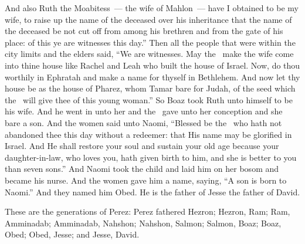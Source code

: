 \begin{inparaenum}
   And also Ruth the Moabitess~--- the wife of Mahlon~--- have I obtained to be my wife, to raise up the name of the deceased over his inheritance that the name of the deceased be not cut off from among his brethren and from the gate of his place: of this ye are witnesses this day.''%
   Then all the people that were within the city limits and the elders said, ``We are witnesses. May the \lord\ make the wife come into thine house like Rachel and Leah who built the house of Israel. Now, do thou worthily in Ephratah and make a name for thyself in Bethlehem.%
   And now let thy house be as the house of Pharez, whom Tamar bare for Judah, of the seed which the \lord\ will give thee of this young woman.''%
   So Boaz took Ruth unto himself to be his wife. And he went in unto her and the \lord\ gave unto her conception and she bare a son.%
   And the women said unto Naomi, ``Blessed be the \lord\ who hath not abandoned thee this day without a redeemer: that His name may be glorified in Israel.%
   And He shall restore your soul and sustain your old age because your daughter-in-law, who loves you, hath given birth to him, and she is better to you than seven sons.''%
   And Naomi took the child and laid him on her bosom and became his nurse.%
   And the women gave him a name, saying, ``A son is born to Naomi.'' And they named him Obed. He is the father of Jesse the father of David.%
  
   These are the generations of Perez: Perez fathered Hezron;%
   Hezron, Ram; Ram, Amminadab;%
   Amminadab, Nahshon; Nahshon, Salmon;%
   Salmon, Boaz; Boaz, Obed;%
   Obed, Jesse; and Jesse, David.%
\end{inparaenum}
